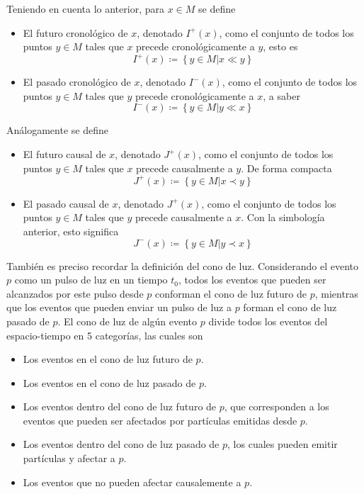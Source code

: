 \documentclass[16pt,a4paper]{article}
\numberwithin{equation}{section}
\theoremstyle{definition}
\begin{document}
Teniendo en cuenta lo anterior, para $x \in M$ se define
\begin{itemize}
\item El futuro cronológico de $x$, denotado $I^+(x)$, como el conjunto de todos los puntos $y \in M$ tales que $x$ precede cronológicamente a $y$, esto es
\begin{equation*}
I^+(x) \coloneqq \left\lbrace y \in M | x \ll y \right\rbrace
\end{equation*}
\item El pasado cronológico de $x$, denotado $I^-(x)$, como el conjunto de todos los puntos $y \in M$ tales que $y$ precede cronológicamente a $x$, a saber
\begin{equation*}
I^-(x) \coloneqq \left\lbrace y \in M | y \ll x \right\rbrace
\end{equation*}
\end{itemize}

Análogamente se define
\begin{itemize}
\item El futuro causal de $x$, denotado $J^+(x)$, como el conjunto de todos los puntos $y \in M$ tales que $x$ precede causalmente a $y$. De forma compacta
\begin{equation*}
J^+(x) \coloneqq \left\lbrace y \in M | x \prec y \right\rbrace
\end{equation*}
\item El pasado causal de $x$, denotado $J^+(x)$, como el conjunto de todos los puntos $y \in M$ tales que $y$ precede causalmente a $x$. Con la simbología anterior, esto significa
\begin{equation*}
J^-(x) \coloneqq \left\lbrace y \in M | y \prec x \right\rbrace
\end{equation*}
\end{itemize}

También es preciso recordar la definición del cono de luz. Considerando el evento $p$ como un pulso de luz en un tiempo $t_0$, todos los eventos que pueden ser alcanzados por este pulso desde $p$ conforman el cono de luz futuro de $p$, mientras que los eventos que pueden enviar un pulso de luz a $p$ forman el cono de luz pasado de $p$. El cono de luz de algún evento $p$ divide todos los eventos del espacio-tiempo en 5 categorías, las cuales son
\begin{itemize}
\item Los eventos en el cono de luz futuro de $p$.

\item Los eventos en el cono de luz pasado de $p$.

\item Los eventos dentro del cono de luz futuro de $p$, que corresponden a los eventos que pueden ser afectados por partículas emitidas desde $p$.

\item Los eventos dentro del cono de luz pasado de $p$, los cuales pueden emitir partículas y afectar a $p$.

\item Los eventos que no pueden afectar causalemente a $p$.
\end{itemize}
\end{document}

